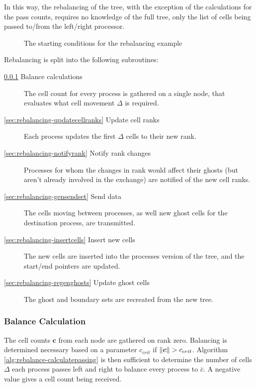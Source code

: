 \documentclass{IIBproject}
\newcommand{\grpath}{../../build/report/movecells}
\newcommand{\vect}[1]{\bm{#1}}
\begin{document}
In this way, the rebalancing of the tree, with the exception of the calculations for the pass counts, requires no knowledge of the full tree, only the list of cells being passed to/from the left/right processor. 

\begin{figure}[H]
	\label{fig:rebalance-init}
	\caption{The starting conditions for the rebalancing example}
	
\end{figure}

Rebalancing is split into the following subroutines:

\begin{description}
	\item[\ref{sec:rebalancing-calc} Balance calculations] The cell count for every process is gathered on a single node, that evaluates what cell movement $\Delta$ is required.
	\item[\ref{sec:rebalancing-updatecellranks} Update cell ranks] Each process updates the first $\Delta$ cells to their new rank.
	\item[\ref{sec:rebalancing-notifyrank} Notify rank changes] Processes for whom the changes in rank would affect their ghosts (but aren't already involved in the exchange) are notified of the new cell ranks.
	\item[\ref{sec:rebalancing-gensendset} Send data] The cells moving between processes, as well new ghost cells for the destination process, are transmitted. 
	\item[\ref{sec:rebalancing-insertcells} Insert new cells] The new cells are inserted into the processes version of the tree, and the start/end pointers are updated.
	\item[\ref{sec:rebalancing-regenghosts} Update ghost cells] The ghost and boundary sets are recreated from the new tree. 
\end{description}


\subsubsection{Balance Calculation}
\label{sec:rebalancing-calc}

The cell counts $\vect{c}$ from each node are gathered on rank zero. Balancing is determined necessary based on a parameter $c_{crit}$ if $\norm{\vect{c}}>c_{crit}$. Algorithm \ref{alg:rebalance-calculatepassing} is then sufficient to determine the number of cells $\Delta$ each process passes left and right to balance every process to $\bar c$. A negative value gives a cell count being received. 
\end{document}
